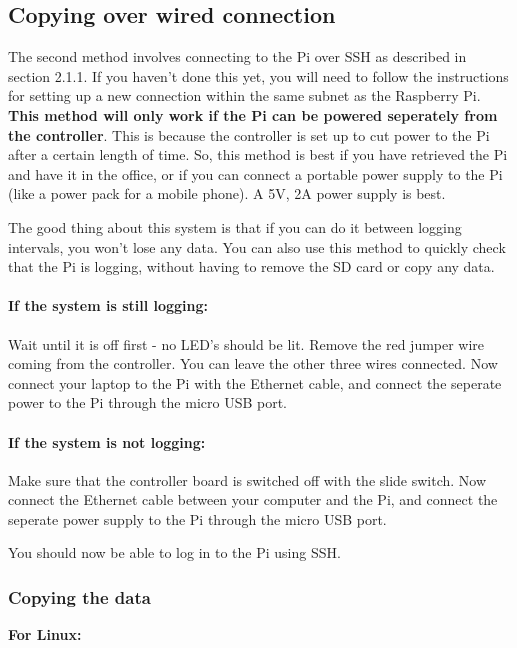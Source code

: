 \documentclass[10pt]{article}
\begin{document}
\subsection{Copying over wired connection}

The second method involves connecting to the Pi over SSH as described in section 2.1.1. If you haven't done this yet, you will need to follow the instructions for setting up a new connection within the same subnet as the Raspberry Pi. \textbf{This method will only work if the Pi can be powered seperately from the controller}. This is because the controller is set up to cut power to the Pi after a certain length of time. So, this method is best if you have retrieved the Pi and have it in the office, or if you can connect a portable power supply to the Pi (like a power pack for a mobile phone). A 5V, 2A power supply is best.

The good thing about this system is that if you can do it between logging intervals, you won't lose any data. You can also use this method to quickly check that the Pi is logging, without having to remove the SD card or copy any data.

\paragraph{If the system is still logging:}
Wait until it is off first - no LED's should be lit. Remove the red jumper wire coming from the controller. You can leave the other three wires connected. Now connect your laptop to the Pi with the Ethernet cable, and connect the seperate power to the Pi through the micro USB port.

\paragraph{If the system is not logging:}
Make sure that the controller board is switched off with the slide switch. Now connect the Ethernet cable between your computer and the Pi, and connect the seperate power supply to the Pi through the micro USB port. \newline

You should now be able to log in to the Pi using SSH. 

\subsubsection{Copying the data}

\textbf{For Linux:} \newline
\end{document}
